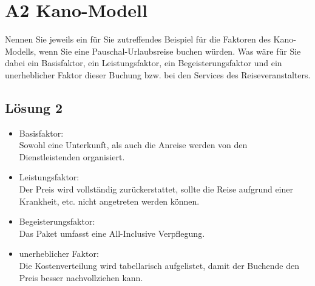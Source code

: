 \documentclass[main.tex]{subfiles}
\begin{document}
\section{A2 Kano-Modell}

Nennen Sie jeweils ein für Sie zutreffendes Beispiel für die Faktoren des Kano-Modells, wenn Sie eine Pauschal-Urlaubsreise buchen würden. Was wäre für Sie dabei ein Basisfaktor, ein Leistungsfaktor, ein Begeisterungsfaktor und ein unerheblicher Faktor dieser Buchung bzw. bei den Services des Reiseveranstalters.

\subsection{Lösung 2}

\begin{itemize}
    \item Basisfaktor:\\
Sowohl eine Unterkunft, als auch die Anreise werden von den Dienstleistenden organisiert.

\item Leistungsfaktor:\\
Der Preis wird vollständig zurückerstattet, sollte die Reise aufgrund einer Krankheit, etc. nicht angetreten werden können.

\item Begeisterungsfaktor:\\
Das Paket umfasst eine All-Inclusive Verpflegung.

\item unerheblicher Faktor:\\
Die Kostenverteilung wird tabellarisch aufgelistet, damit der Buchende den Preis besser nachvollziehen kann.
\end{itemize}
\end{document}
